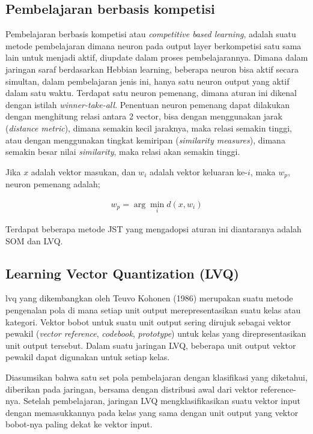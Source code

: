 \subsection{Pembelajaran berbasis kompetisi}
Pembelajaran berbasis kompetisi atau \textit{competitive based learning}, adalah
suatu metode pembelajaran dimana neuron pada output layer berkompetisi satu sama lain
untuk menjadi aktif, diupdate dalam proses pembelajarannya. Dimana
dalam jaringan saraf berdasarkan Hebbian learning, beberapa neuron bisa aktif
secara simultan, dalam pembelajaran jenis ini, hanya satu neuron output yang
aktif dalam satu waktu. Terdapat satu neuron pemenang, dimana aturan ini dikenal
dengan istilah \textit{winner-take-all}. Penentuan neuron pemenang dapat
dilakukan dengan menghitung relasi antara 2 vector, bisa
dengan menggunakan jarak (\textit{distance metric}), dimana semakin kecil
jaraknya, maka relasi semakin tinggi, atau dengan menggunakan tingkat
kemiripan (\textit{similarity measures}), dimana semakin besar nilai
\textit{similarity}, maka relasi akan semakin tinggi. 

Jika $x$ adalah vektor masukan, dan  $w_i$ adalah vektor keluaran ke-$i$, maka
$w_p$, neuron pemenang adalah;

\begin{align}
\label{eq:lvqwin}
	w_p = \arg \min_i d(x, w_i)
\end{align}

Terdapat beberapa metode JST yang mengadopsi aturan ini diantaranya adalah SOM
dan LVQ.

\subsection{Learning Vector Quantization (LVQ)}

\Gls{lvq} yang dikembangkan oleh Teuvo Kohonen (1986) \cite{Kohonen-1986b}
merupakan suatu metode pengenalan pola di mana setiap unit output
merepresentasikan suatu kelas atau kategori. Vektor bobot untuk suatu unit
output sering dirujuk sebagai vektor pewakil (\textit{vector reference},
\textit{codebook}, \textit{prototype}) untuk kelas yang direpresentasikan unit
output tersebut. Dalam suatu jaringan LVQ, beberapa unit output vektor pewakil
dapat digunakan untuk setiap kelas. 

Diasumsikan bahwa satu set pola pembelajaran dengan klasifikasi yang diketahui,
diberikan pada jaringan, bersama dengan distribusi awal dari vektor
reference-nya. Setelah pembelajaran, jaringan LVQ mengklasifikasikan suatu
vektor input dengan memasukkannya pada kelas yang sama dengan unit output yang
vektor bobot-nya paling dekat ke vektor input.

